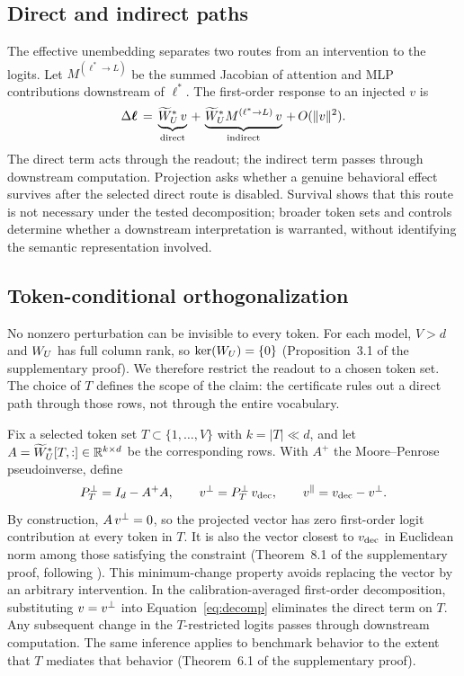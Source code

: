 \subsection{Direct and indirect paths}

The effective unembedding separates two routes from an intervention to the logits. Let $M^{(\ell^{*} \to L)}$ be the summed Jacobian of attention and MLP contributions downstream of $\ell^{*}$. The first-order response to an injected $v$ is
\begin{equation}
\Delta\bm{\ell} \,=\, \underbrace{\widetilde{W}_{U}^{*}\, v}_{\text{direct}} \, + \, \underbrace{\widetilde{W}_{U}^{*} M^{(\ell^{*} \to L)}\, v}_{\text{indirect}} \, + \, O(\|v\|^2).
\label{eq:decomp}
\end{equation}
The direct term acts through the readout; the indirect term passes through downstream computation. Projection asks whether a genuine behavioral effect survives after the selected direct route is disabled. Survival shows that this route is not necessary under the tested decomposition; broader token sets and controls determine whether a downstream interpretation is warranted, without identifying the semantic representation involved.

\subsection{Token-conditional orthogonalization}

No nonzero perturbation can be invisible to every token. For each model, $V > d$ and $W_{U}$ has full column rank, so $\ker(W_{U}) = \{0\}$ (Proposition~3.1 of the supplementary proof). We therefore restrict the readout to a chosen token set. The choice of $T$ defines the scope of the claim: the certificate rules out a direct path through those rows, not through the entire vocabulary.

Fix a selected token set $T \subset \{1,\dots,V\}$ with $k = |T| \ll d$, and let $A = \widetilde{W}_{U}^{*}[T,:] \in \mathbb{R}^{k \times d}$ be the corresponding rows. With $A^{+}$ the Moore--Penrose pseudoinverse, define
\begin{equation}
P_{T}^{\perp} = I_d - A^{+}A, \qquad v^{\perp} = P_{T}^{\perp}\,v_{\mathrm{dec}}, \qquad v^{\parallel} = v_{\mathrm{dec}} - v^{\perp} .
\label{eq:projection}
\end{equation}
By construction, $A\,v^{\perp} = 0$, so the projected vector has zero first-order logit contribution at every token in $T$. It is also the vector closest to $v_{\mathrm{dec}}$ in Euclidean norm among those satisfying the constraint (Theorem~8.1 of the supplementary proof, following \citealp{belrose2023leace}). This minimum-change property avoids replacing the vector by an arbitrary intervention. In the calibration-averaged first-order decomposition, substituting $v = v^{\perp}$ into Equation~\ref{eq:decomp} eliminates the direct term on $T$. Any subsequent change in the $T$-restricted logits passes through downstream computation. The same inference applies to benchmark behavior to the extent that $T$ mediates that behavior (Theorem~6.1 of the supplementary proof).

